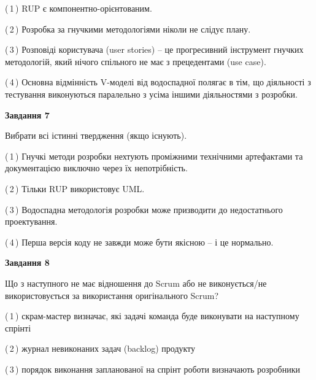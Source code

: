 \documentclass[10pt, ukrainian]{article}
\begin{document}
{\begin {large}
(\,1\,) RUP є компонентно-орієнтованим. %



(\,2\,) Розробка за гнучкими методологіями ніколи не слідує плану. %



(\,3\,) Розповіді користувача (user stories) – це прогресивний інструмент гнучких методологій, який нічого спільного не має з прецедентами (use case). %



(\,4\,) Основна відмінність V-моделі від водоспадної полягає в тім, що діяльності з тестування виконуються паралельно з усіма іншими діяльностями з розробки. %


{\begin {center}\textbf{Завдання 7}\end {center}}\par
Вибрати всі істинні твердження (якщо існують).\par
\vspace{2mm}



(\,1\,) Гнучкі методи розробки нехтують проміжними технічними артефактами та документацією виключно через їх непотрібність. %



(\,2\,) Тільки RUP використовує UML.%



(\,3\,) Водоспадна методологія розробки може призводити до недостатнього проектування. %



(\,4\,) Перша версія коду не завжди може бути якісною -- і це нормально. %


{\begin {center}\textbf{Завдання 8}\end {center}}\par
Що з наступного не має відношення до Scrum або не виконується/не використовується за використання оригінального Scrum?\par
\vspace{2mm}



(\,1\,) скрам-мастер визначає, які задачі команда буде виконувати на наступному спрінті%



(\,2\,) журнал невиконаних задач (backlog) продукту%



(\,3\,) порядок виконання запланованої на спрінт роботи визначають розробники%




\end{large}}
\end{document}
